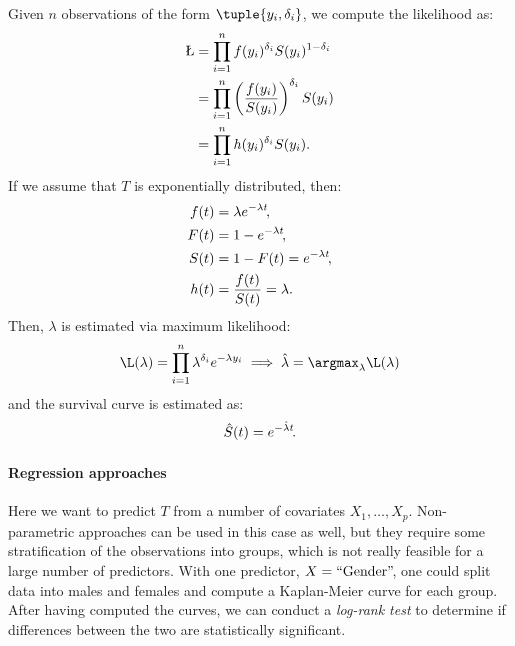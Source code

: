 Given $n$ observations of the form $\tuple{y_i, \delta_i}$, we compute the likelihood as:
\begin{equation}
    \begin{aligned}
        \L & = \prod_{i=1}^n f(y_i)^{\delta_i} S(y_i)^{1 - \delta_i}              \\
           & = \prod_{i=1}^n \left(\frac{f(y_i)}{S(y_i)}\right)^{\delta_i} S(y_i) \\
           & = \prod_{i=1}^n h(y_i)^{\delta_i} S(y_i).
    \end{aligned}
\end{equation}
If we assume that $T$ is exponentially distributed, then:
\begin{equation}
    \begin{aligned}
        f(t) & = \lambda e^{-\lambda t}\negthinspace,    \\
        F(t) & = 1 - e^{-\lambda t}\negthinspace,        \\
        S(t) & = 1 - F(t) = e^{-\lambda t}\negthinspace, \\
        h(t) & = \frac{f(t)}{S(t)} = \lambda.
    \end{aligned}
\end{equation}
Then, $\lambda$ is estimated via maximum likelihood:
\begin{equation}
    \L(\lambda) = \prod_{i=1}^n \lambda^{\delta_i} e^{-\lambda y_i} \implies \hat{\lambda} = \argmax_{\lambda} \L(\lambda)
\end{equation}
and the survival curve is estimated as:
\begin{equation}
    \hat{S}(t) = e^{-\hat{\lambda} t}\negthinspace.
\end{equation}

\paragraph{Regression approaches}

Here we want to predict $T$ from a number of covariates $X_1, \ldots, X_p$. {Non-parametric} approaches can be used in this case as well, but they require some stratification of the observations into groups, which is not really feasible for a large number of predictors. With one predictor, \eg $X = \text{``Gender''}\negthinspace$, one could split data into males and females and compute a Kaplan-Meier curve for each group. After having computed the curves, we can conduct a \emph{log-rank test} to determine if differences between the two are statistically significant.

